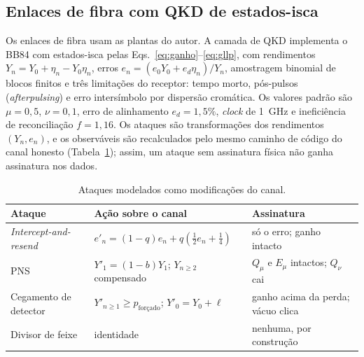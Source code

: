 \documentclass[12pt]{article}
\begin{document}
\subsection{Enlaces de fibra com QKD de estados-isca}
\label{sec:tec_fibra}

Os enlaces de fibra usam as plantas do autor. A camada de QKD implementa o BB84
com estados-isca pelas Eqs.~\ref{eq:ganho}--\ref{eq:gllp}, com rendimentos
$Y_n=Y_0+\eta_n-Y_0\eta_n$, erros $e_n=(e_0Y_0+e_d\eta_n)/Y_n$, amostragem
binomial de blocos finitos e três limitações do receptor: tempo morto, pós-pulsos
(\textit{afterpulsing}) e erro intersímbolo por dispersão cromática. Os valores
padrão são $\mu=0{,}5$, $\nu=0{,}1$, erro de alinhamento $e_d=1{,}5\%$,
\textit{clock} de 1~GHz e ineficiência de reconciliação $f=1{,}16$. Os ataques
são transformações dos rendimentos $(Y_n,e_n)$, e os observáveis são
recalculados pelo mesmo caminho de código do canal honesto
(Tabela~\ref{tab:ataques}); assim, um ataque sem assinatura física não ganha
assinatura nos dados.

\begin{table}[ht]
\centering
\caption{Ataques modelados como modificações do canal.}
\label{tab:ataques}
\small
\begin{tabular}{>{\raggedright\arraybackslash}p{3.3cm}>{\raggedright\arraybackslash}p{4.9cm}>{\raggedright\arraybackslash}p{4.5cm}}
\toprule
Ataque & Ação sobre o canal & Assinatura \\
\midrule
\textit{Intercept-and-resend} & $e'_n=(1-q)e_n+q\left(\tfrac{1}{2}e_n+\tfrac{1}{4}\right)$ & só o erro; ganho intacto \\
PNS & $Y'_1=(1-b)Y_1$; $Y_{n\ge2}$ compensado & $Q_\mu$ e $E_\mu$ intactos; $Q_\nu$ cai \\
Cegamento de detector & $Y'_{n\ge1}\ge p_{\text{forçado}}$; $Y'_0=Y_0+\ell$ & ganho acima da perda; vácuo clica \\
Divisor de feixe & identidade & nenhuma, por construção \\
\bottomrule
\end{tabular}
\end{table}
\end{document}
